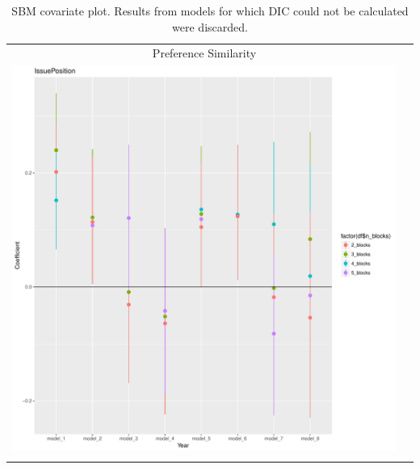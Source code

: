 \documentclass[fleqn,12pt]{wlscirep}
\begin{document}
\restoregeometry




\clearpage
\begin{longtable}[!h]{c@{\hskip 0cm}c}
Preference Similarity \\
\includegraphics[height=.75\textheight, clip=true, trim=.5cm .5cm 0cm .6cm]{figures/rl_plots2/IssuePosition.pdf} \\
\caption{\label{fig:SBM_plot_pref} SBM covariate plot. Results from models for which DIC could not be calculated were discarded.}
\end{longtable}
\end{document}
